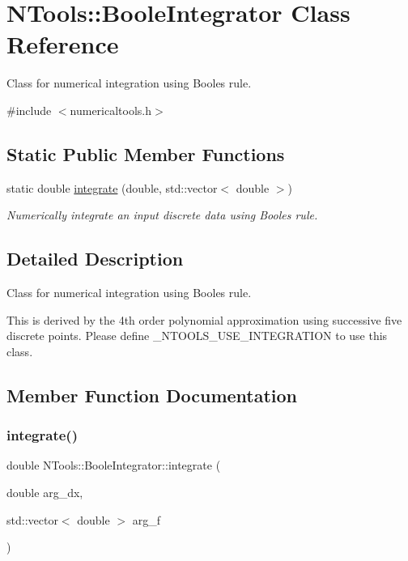 \hypertarget{class_n_tools_1_1_boole_integrator}{}\section{N\+Tools\+::Boole\+Integrator Class Reference}
\label{class_n_tools_1_1_boole_integrator}


Class for numerical integration using Boole\textquotesingle{}s rule.  




{\ttfamily \#include $<$numericaltools.\+h$>$}

\subsection*{Static Public Member Functions}
\begin{DoxyCompactItemize}
\item 
static double \mbox{\hyperlink{class_n_tools_1_1_boole_integrator_abf91f56c5ad07dcaf995b4c81f7f970b}{integrate}} (double, std\+::vector$<$ double $>$)
\begin{DoxyCompactList}\small\item\em Numerically integrate an input discrete data using Boole\textquotesingle{}s rule. \end{DoxyCompactList}\end{DoxyCompactItemize}


\subsection{Detailed Description}
Class for numerical integration using Boole\textquotesingle{}s rule. 

This is derived by the 4th order polynomial approximation using successive five discrete points. Please define \+\_\+\+N\+T\+O\+O\+L\+S\+\_\+\+U\+S\+E\+\_\+\+I\+N\+T\+E\+G\+R\+A\+T\+I\+ON to use this class. 

\subsection{Member Function Documentation}
\mbox{\label{class_n_tools_1_1_boole_integrator_abf91f56c5ad07dcaf995b4c81f7f970b}} 
\subsubsection{\texorpdfstring{integrate()}{integrate()}}
{\footnotesize\ttfamily double N\+Tools\+::\+Boole\+Integrator\+::integrate (\begin{DoxyParamCaption}\item[{double}]{arg\+\_\+dx,  }\item[{std\+::vector$<$ double $>$}]{arg\+\_\+f }\end{DoxyParamCaption})\hspace{0.3cm}{\ttfamily [static]}}



